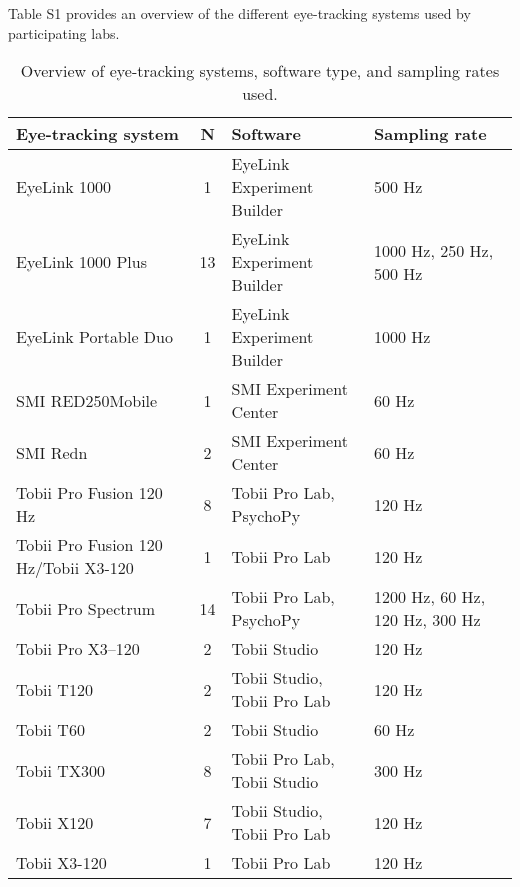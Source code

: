 \documentclass[
  man, donotrepeattitle,floatsintext]{apa6}
\begin{document}
Table S1 provides an overview of the different eye-tracking systems used by participating labs.

\begin{table}[tbp]

\begin{center}
\begin{threeparttable}

\caption{\label{tab:Overwiew eye-tracking systems}Overview of eye-tracking systems, software type, and sampling rates used.}

\footnotesize{

\begin{tabular}{lcll}
\toprule
Eye-tracking system & N & Software & Sampling rate\\
\midrule
EyeLink 1000 & 1 & EyeLink Experiment Builder & 500 Hz\\
EyeLink 1000 Plus & 13 & EyeLink Experiment Builder & 1000 Hz, 250 Hz, 500 Hz\\
EyeLink Portable Duo & 1 & EyeLink Experiment Builder & 1000 Hz\\
SMI RED250Mobile & 1 & SMI Experiment Center & 60 Hz\\
SMI Redn & 2 & SMI Experiment Center & 60 Hz\\
Tobii Pro Fusion 120 Hz & 8 & Tobii Pro Lab, PsychoPy & 120 Hz\\
Tobii Pro Fusion 120 Hz/Tobii X3-120 & 1 & Tobii Pro Lab & 120 Hz\\
Tobii Pro Spectrum & 14 & Tobii Pro Lab, PsychoPy & 1200 Hz, 60 Hz, 120 Hz, 300 Hz\\
Tobii Pro X3–120 & 2 & Tobii Studio & 120 Hz\\
Tobii T120 & 2 & Tobii Studio, Tobii Pro Lab & 120 Hz\\
Tobii T60 & 2 & Tobii Studio & 60 Hz\\
Tobii TX300 & 8 & Tobii Pro Lab, Tobii Studio & 300 Hz\\
Tobii X120 & 7 & Tobii Studio, Tobii Pro Lab & 120 Hz\\
Tobii X3-120 & 1 & Tobii Pro Lab & 120 Hz\\
\bottomrule
\end{tabular}

}

\end{threeparttable}
\end{center}

\end{table}

\newpage
\end{document}
